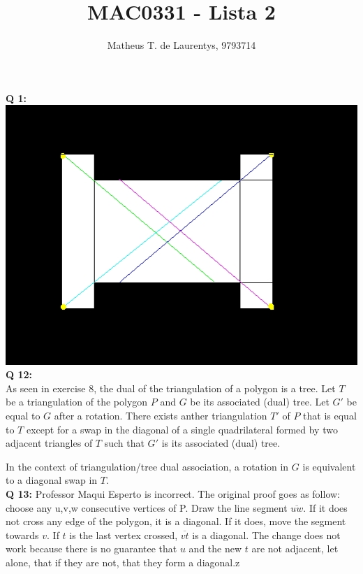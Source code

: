 \documentclass[]{article}
\title{\vspace{-4.0cm}MAC0331 - Lista 2}
\author{Matheus T. de Laurentys, 9793714}
\begin{document}
	\maketitle
	\noindent
	\textbf{Q 1:} \\
	\includegraphics[scale=0.8]{lista2im.jpeg} \\
	\textbf{Q 12:} \\
	As seen in exercise 8, the dual of the triangulation of a polygon is a tree. Let $T$ be a triangulation of the polygon $P$ and $G$ be its associated (dual) tree. Let $G'$ be equal to $G$ after a rotation. There exists anther triangulation $T'$ of $P$ that is equal to $T$ except for a swap in the diagonal of a single quadrilateral formed by two adjacent triangles of $T$ such that $G'$ is its associated (dual) tree.
	
	In the context of triangulation/tree dual association, a rotation in $G$ is equivalent to a diagonal swap in $T$. \\
	\textbf{Q 13:}
	Professor Maqui Esperto is incorrect. The original proof goes as follow: choose any u,v,w consecutive vertices of P. Draw the line segment $\overline{uw}$. If it does not cross any edge of the polygon, it is a diagonal. If it does, move the segment towards $v$. If $t$ is the last vertex crossed, $\overline{vt}$ is a diagonal. The change does not work because there is no guarantee that $u$ and the new $t$ are not adjacent, let alone, that if they are not, that they form a diagonal.z
\end{document}
